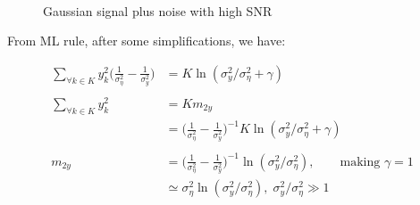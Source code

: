 \documentclass[17pt,a4paper]{extarticle}
\begin{document}
\begin{figure}
	\centering
	\\
	\caption{Gaussian signal plus noise with high SNR}\label{Fig:DiagRxOptDig}
\end{figure}

From ML rule, after some simplifications, we have:
\begin{linenomath*} 
	\begin{align*}
		\sum_{\forall k\in K}y^{2}_k\big( \frac{1}{\sigma^{2}_{\eta}} - \frac{1}{\sigma^{2}_{y}}\big)&= K \ln (\sigma^{2}_{y}/\sigma^{2}_{\eta}+\gamma)\\
		\\
		\sum_{\forall k\in K}y^{2}_k&=K m_{2y}\\
		&=\big( \frac{1}{\sigma^{2}_{\eta}} - \frac{1}{\sigma^{2}_{y}}\big)^{-1} K \ln (\sigma^{2}_{y}/\sigma^{2}_{\eta}+\gamma)\\
		\\
		 {m_{2y}}&= {\big( \frac{1}{\sigma^{2}_{\eta}} - \frac{1}{\sigma^{2}_{y}}\big)^{-1} \ln (\sigma^{2}_{y}/\sigma^{2}_{\eta} )},\qquad \textrm{making }\gamma=1\\
		 & \simeq \sigma^{2}_{\eta} \ln (\sigma^{2}_{y}/\sigma^{2}_{\eta} ), \; \sigma^{2}_{y}/\sigma^{2}_{\eta}\gg 1
	\end{align*}
\end{linenomath*}
\end{document}
